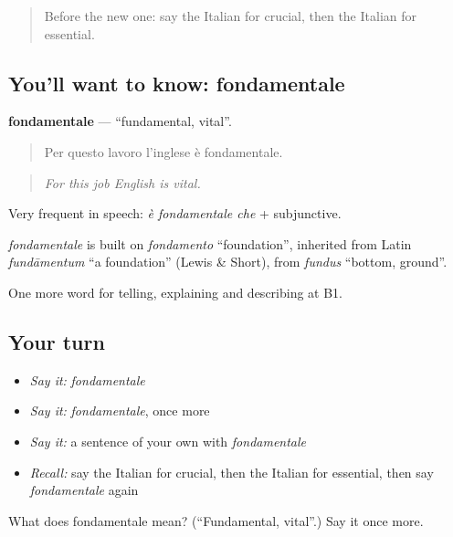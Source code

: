 \begin{quote}
Before the new one: say the Italian for crucial, then the Italian for essential.
\end{quote}

\subsection*{You'll want to know: fondamentale}
\textbf{fondamentale} — \textquotedblleft{}fundamental, vital\textquotedblright{}.

\begin{quote}
Per questo lavoro l'inglese è fondamentale.
\end{quote}

\begin{quote}
\emph{For this job English is vital.}
\end{quote}

Very frequent in speech: \emph{è fondamentale che} + subjunctive.

\begin{cousinweb}
\emph{fondamentale} is built on \emph{fondamento} \textquotedblleft{}foundation\textquotedblright{}, inherited from Latin \emph{fundāmentum} \textquotedblleft{}a foundation\textquotedblright{} (Lewis \& Short), from \emph{fundus} \textquotedblleft{}bottom, ground\textquotedblright{}.
\end{cousinweb}

\begin{grammarlens}[title={What you've built}]
One more word for telling, explaining and describing at B1.
\end{grammarlens}

\subsection*{Your turn}
\begin{itemize}
\raggedright
  \item \emph{Say it:} \emph{fondamentale}
  \item \emph{Say it:} \emph{fondamentale}, once more
  \item \emph{Say it:} a sentence of your own with \emph{fondamentale}
  \item \emph{Recall:} say the Italian for crucial, then the Italian for essential, then say \emph{fondamentale} again
\end{itemize}

\begin{tcolorbox}[breakable,colback=teal!4,colframe=teal!35!black,title={Before you move on}]
What does fondamentale mean? (\textquotedblleft{}Fundamental, vital\textquotedblright{}.) Say it once more.
\end{tcolorbox}
